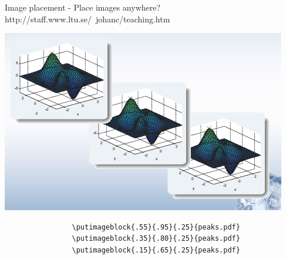 \begin{frame}[fragile]{Image placement - Place images anywhere?}{http://staff.www.ltu.se/~johanc/teaching.htm}
	\begin{minipage}[b]{0.4\textwidth}
	\includegraphics[width=\textwidth]{img/4-imagefloat.png}
	\end{minipage}
	\begin{minipage}[c]{\textwidth}
	    \begin{block}{}
	    	\begin{lstlisting}
				\putimageblock{.55}{.95}{.25}{peaks.pdf}
				\putimageblock{.35}{.80}{.25}{peaks.pdf}
				\putimageblock{.15}{.65}{.25}{peaks.pdf}
			\end{lstlisting}
		\end{block}
	\end{minipage}
		
\end{frame}